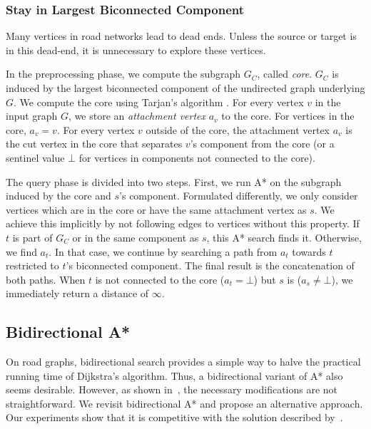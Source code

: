 \documentclass[manuscript]{acmart}
\begin{document}
\subsubsection{Stay in Largest Biconnected Component}\label{sec:largested-biconnected-component}

Many vertices in road networks lead to dead ends.
Unless the source or target is in this dead-end, it is unnecessary to explore these vertices.

In the preprocessing phase, we compute the subgraph $G_C$, called \emph{core}.
$G_C$ is induced by the largest biconnected component of the undirected graph underlying $G$.
We compute the core using Tarjan's algorithm \cite{t-dfslg2-72}.
For every vertex $v$ in the input graph $G$, we store an \emph{attachment vertex} $a_v$ to the core.
For vertices in the core, $a_v=v$.
For every vertex $v$ outside of the core, the attachment vertex $a_v$ is the cut vertex in the core that separates $v$'s component from the core (or a sentinel value $\bot$ for vertices in components not connected to the core).

The query phase is divided into two steps.
First, we run A* on the subgraph induced by the core and $s$'s component.
Formulated differently, we only consider vertices which are in the core or have the same attachment vertex as $s$.
We achieve this implicitly by not following edges to vertices without this property.
If $t$ is part of $G_C$ or in the same component as $s$, this A* search finds it.
Otherwise, we find $a_t$.
In that case, we continue by searching a path from $a_t$ towards $t$ restricted to $t$'s biconnected component.
The final result is the concatenation of both paths.
When $t$ is not connected to the core ($a_t = \bot$) but $s$ is ($a_s \neq \bot$), we immediately return a distance of $\infty$.

\subsection{Bidirectional A*}\label{sec:bidir_astar}

On road graphs, bidirectional search provides a simple way to halve the practical running time of Dijkstra's algorithm.
Thus, a bidirectional variant of A*  also seems desirable.
However, as shown in~\cite{gh-cspas-05}, the necessary modifications are not straightforward.
We revisit bidirectional A* and propose an alternative approach.
Our experiments show that it is competitive with the solution described by~\cite{gh-cspas-05}.
\end{document}
